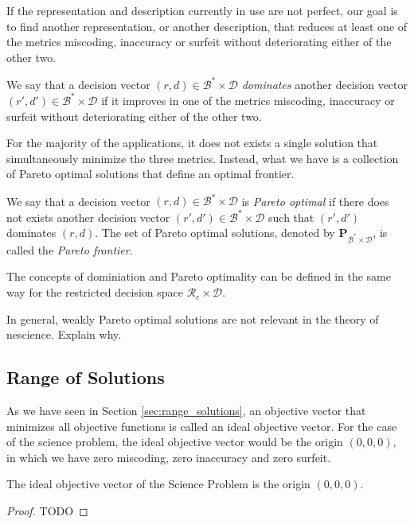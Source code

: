 If the representation and description currently in use are not perfect, our goal is to find another representation, or another description, that reduces at least one of the metrics miscoding, inaccuracy or surfeit without deteriorating either of the other two.

\begin{definition}
We say that a decision vector $(r, d) \in \mathcal{B}^\ast \times \mathcal{D}$ \emph{dominates} another decision vector $(r', d') \in \mathcal{B}^\ast \times \mathcal{D}$ if it improves in one of the metrics miscoding, inaccuracy or surfeit without deteriorating either of the other two.
\end{definition}

For the majority of the applications, it does not exists a single solution that simultaneously minimize the three metrics. Instead, what we have is a collection of Pareto optimal solutions that define an optimal frontier.

\begin{definition}
We say that a decision vector $(r, d) \in \mathcal{B}^\ast \times \mathcal{D}$ is \emph{Pareto optimal} if there does not exists another decision vector $(r', d') \in \mathcal{B}^\ast \times \mathcal{D}$ such that $(r', d')$ dominates $(r, d)$. The set of Pareto optimal solutions, denoted by $\mathbf{P}_{\mathcal{B}^\ast \times \mathcal{D}}$, is called the \emph{Pareto frontier}.
\end{definition}

The concepts of dominiation and Pareto optimality can be defined in the same way for the restricted decision space $\mathcal{R}_e \times \mathcal{D}$.

In general, weakly Pareto optimal solutions are not relevant in the theory of nescience. {\color{red} Explain why.}


\subsection{Range of Solutions}

As we have seen in Section \ref{sec:range_solutions}, an objective vector that minimizes all objective functions is called an ideal objective vector. For the case of the science problem, the ideal objective vector would be the origin $(0, 0, 0)$, in which we have zero miscoding, zero inaccuracy and zero surfeit.

\begin{proposition}
The ideal objective vector of the Science Problem is the origin $(0, 0, 0)$.
\end{proposition}
\begin{proof}
{\color{red} TODO}
\end{proof}

